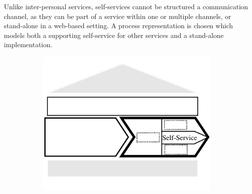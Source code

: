 	Unlike inter-personal services, self-services cannot be structured \wrt a communication channel, as they can be part of a service within one or multiple channels, or stand-alone in a web-based setting. A process representation is chosen which models both a supporting self-service for other services and a stand-alone implementation.
	
	\begin{figure}[caption={Self-Service process}, label={fig:selfservice}]
		\begin{subfigure}[b]{.45\textwidth}
			\begin{center}
				\includegraphics{figures/self-service.pdf}
			\end{center}
		\end{subfigure}
		\begin{subfigure}[b]{.45\textwidth}
			\begin{center}
			\end{center}
		\end{subfigure}
		
	\end{figure}

